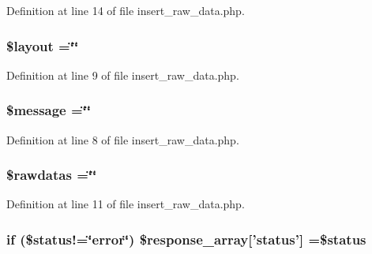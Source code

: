 Definition at line 14 of file insert\-\_\-raw\-\_\-data.\-php.

\hypertarget{insert__raw__data_8php_a2b0d08e73a90b9443ce37506b7c6a544}{
\subsubsection[{\$layout}]{\setlength{\rightskip}{0pt plus 5cm}\$layout =\char`\"{}\char`\"{}}}\label{insert__raw__data_8php_a2b0d08e73a90b9443ce37506b7c6a544}


Definition at line 9 of file insert\-\_\-raw\-\_\-data.\-php.

\hypertarget{insert__raw__data_8php_abf17cb2dba2ed17cb28aa5f37deb5293}{
\subsubsection[{\$message}]{\setlength{\rightskip}{0pt plus 5cm}\$message =\char`\"{}\char`\"{}}}\label{insert__raw__data_8php_abf17cb2dba2ed17cb28aa5f37deb5293}


Definition at line 8 of file insert\-\_\-raw\-\_\-data.\-php.

\hypertarget{insert__raw__data_8php_abdab71b959b28075ae105e76f2bb59c4}{
\subsubsection[{\$rawdatas}]{\setlength{\rightskip}{0pt plus 5cm}\$rawdatas =\char`\"{}\char`\"{}}}\label{insert__raw__data_8php_abdab71b959b28075ae105e76f2bb59c4}


Definition at line 11 of file insert\-\_\-raw\-\_\-data.\-php.

\hypertarget{insert__raw__data_8php_a47f5bcc722487ea6fe6ca2d1b5b870c1}{
\subsubsection[{\$response\-\_\-array}]{\setlength{\rightskip}{0pt plus 5cm}if (\$status!=\char`\"{}error\char`\"{}) \$response\-\_\-array\mbox{[}'status'\mbox{]} =\$status}}\label{insert__raw__data_8php_a47f5bcc722487ea6fe6ca2d1b5b870c1}


